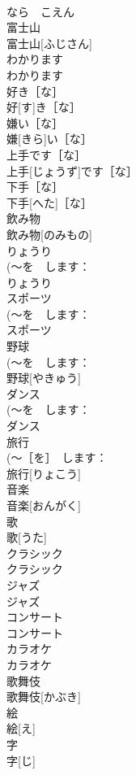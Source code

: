 \documentclass[8pt]{extreport}
\begin{document}
\begin{CJK}{UTF8}{min}
\\	なら　こえん	
\\	富士山	
\\	富士山[ふじさん]	
\\	わかります	
\\	わかります	
\\	好き［な］	
\\	好[す]き［な］	
\\	嫌い［な］	
\\	嫌[きら]い［な］	
\\	上手です［な］	
\\	上手[じょうず]です［な］	
\\	下手［な］	
\\	下手[へた]［な］	
\\	飲み物	
\\	飲み物[のみもの]	
\\	りょうり	
\\	(～を　します：
\\	りょうり	
\\	スポーツ	
\\	(～を　します：
\\	スポーツ	
\\	野球	
\\	(～を　します：
\\	野球[やきゅう]	
\\	ダンス	
\\	(～を　します：
\\	ダンス	
\\	旅行	
\\	(～［を］　します：
\\	旅行[りょこう]	
\\	音楽	
\\	音楽[おんがく]	
\\	歌	
\\	歌[うた]	
\\	クラシック	
\\	クラシック	
\\	ジャズ	
\\	ジャズ	
\\	コンサート	
\\	コンサート	
\\	カラオケ	
\\	カラオケ	
\\	歌舞伎	
\\	歌舞伎[かぶき]	
\\	絵	
\\	絵[え]	
\\	字	
\\	字[じ]	

\end{CJK}
\end{document}
